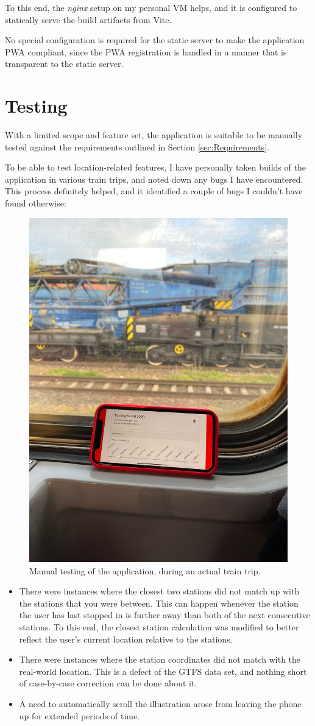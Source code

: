 To this end, the \textit{nginx} setup on my personal VM helps, and it is configured to statically serve the build artifacts from Vite.

No special configuration is required for the static server to make the application PWA compliant, since the PWA registration is handled in a manner that is transparent to the static server.

\section{Testing}
With a limited scope and feature set, the application is suitable to be manually tested against the requirements outlined in Section \ref{sec:Requirements}.

To be able to test location-related features, I have personally taken builds of the application in various train trips, and noted down any bugs I have encountered. This process definitely helped, and it identified a couple of bugs I couldn't have found otherwise:

\begin{figure}[htbp]
    \centering
    \includegraphics[width=.5\textwidth]{./figures/ch4_manual-testing.JPG}
    \caption{Manual testing of the application, during an actual train trip.}
    \label{FigManualTesting}
\end{figure}

\begin{itemize}
    \item There were instances where the closest two stations did not match up with the stations that you were between. This can happen whenever the station the user has last stopped in is further away than both of the next consecutive stations. To this end, the closest station calculation was modified to better reflect the user's current location relative to the stations.
    \item There were instances where the station coordinates did not match with the real-world location. This is a defect of the GTFS data set, and nothing short of case-by-case correction can be done about it.
    \item A need to automatically scroll the illustration arose from leaving the phone up for extended periods of time.
\end{itemize}